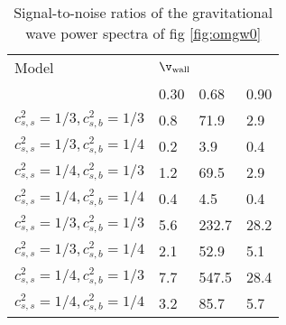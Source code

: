 \begin{table}
\centering
\caption{Signal-to-noise ratios of the gravitational wave power spectra of fig \ref{fig:omgw0}}
\begin{tabular}{l|l|l|l}
Model & \multicolumn{3}{l}{$\v_\text{wall}$} \\
& 0.30 & 0.68 & 0.90
\hline \\
$c_{s,s}^2=1/3, c_{s,b}^2=1/3$ & 0.8 & 71.9 & 2.9 \\
$c_{s,s}^2=1/3, c_{s,b}^2=1/4$ & 0.2 & 3.9 & 0.4 \\
$c_{s,s}^2=1/4, c_{s,b}^2=1/3$ & 1.2 & 69.5 & 2.9 \\
$c_{s,s}^2=1/4, c_{s,b}^2=1/4$ & 0.4 & 4.5 & 0.4 \hline \\
$c_{s,s}^2=1/3, c_{s,b}^2=1/3$ & 5.6 & 232.7 & 28.2 \\
$c_{s,s}^2=1/3, c_{s,b}^2=1/4$ & 2.1 & 52.9 & 5.1 \\
$c_{s,s}^2=1/4, c_{s,b}^2=1/3$ & 7.7 & 547.5 & 28.4 \\
$c_{s,s}^2=1/4, c_{s,b}^2=1/4$ & 3.2 & 85.7 & 5.7 \\
\end{tabular}
\label{table:const_cs_gw_snr}
\end{table}
